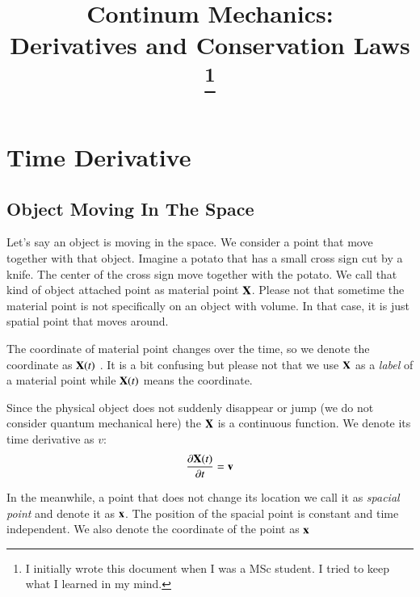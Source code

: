 


\title{Continum Mechanics:\\ Derivatives and Conservation Laws \footnote{I initially wrote this document when I was a MSc student. I tried to keep what I learned in my mind.}}



\maketitle
\tableofcontents
\section{Time Derivative}


\subsection{Object Moving In The Space}

Let's say an object is moving in the space.
%
We consider a point that move together with that object.
%
Imagine a potato that has a small cross sign cut by a knife. 
%
The center of the cross sign move together with the potato. 
%
We call that kind of object attached point as material point $\mathbf{X}$.
%
Please not that sometime the material point is not specifically on an object with volume. 
%
In that case, it is just spatial point that moves around.

The coordinate of material point changes over the time, so we denote the coordinate as ${\mathbf{X}}(t)$ .
%
It is a bit confusing but please not that we use $\mathbf{X}$ as a \textit{label} of a material point while $\mathbf{X}(t)$ means the coordinate. 


Since the physical object does not suddenly disappear or jump (we do not consider quantum mechanical here) the $\mathbf{X}$ is a continuous function.
%
We denote its time derivative as $v$:
%
\begin{equation}
\frac{\partial\mathbf{X}(t)}{\partial{t}} = \mathbf{v}
\end{equation}
%

In the meanwhile, a point that does not change its location we call it as \textit{spacial point} and denote it as $\mathbf{x}$.
%
The position of the spacial point is constant and time independent. 
%
We also denote the coordinate of the point as $\mathbf{x}$


